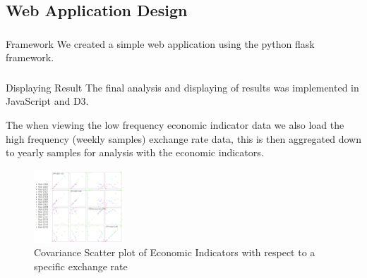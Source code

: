 \subsection{Web Application Design}
\subsubsection{}{Framework}
We created a simple web application using the python flask framework.
\subsubsection{}{Displaying Result}
The final analysis and displaying of results was implemented in JavaScript and D3.  

The when viewing the low frequency economic indicator data we also load the high frequency (weekly samples) exchange rate data, this is then aggregated down to yearly samples for analysis with the economic indicators.
\newline
 
\begin{figure}[!h]
	\begin{center}
		\includegraphics[width=0.30\textwidth]{web.jpg}
		\caption{Covariance Scatter plot of Economic Indicators with respect to a specific exchange rate}
		\label{scatter_plot}
	\end{center}
\end{figure}

